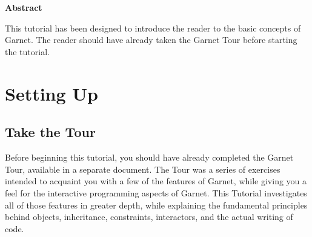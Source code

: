 
\begin{titlepage}
\vspace{0.6in}

 \\

 \\
\centering{\today{}}
  \begin{center} {\bf Abstract}\end{center}
  This tutorial has been designed to introduce the reader to the basic
  concepts of Garnet.  The reader should have already taken the Garnet
  Tour before starting the tutorial.
  \vspace{\fill}
  
\end{titlepage}

\tableofcontents{}


% 

\chapter{Setting Up}

\section{Take the Tour}

Before beginning this tutorial, you should have already completed the
Garnet Tour, available in a separate document.  The Tour was a series
of exercises intended to acquaint you with a few of the features of
Garnet, while giving you a feel for the interactive programming aspects
of Garnet.  This Tutorial investigates all of those features in
greater depth, while explaining the fundamental principles behind
objects, inheritance, constraints, interactors, and the actual writing
of code.


